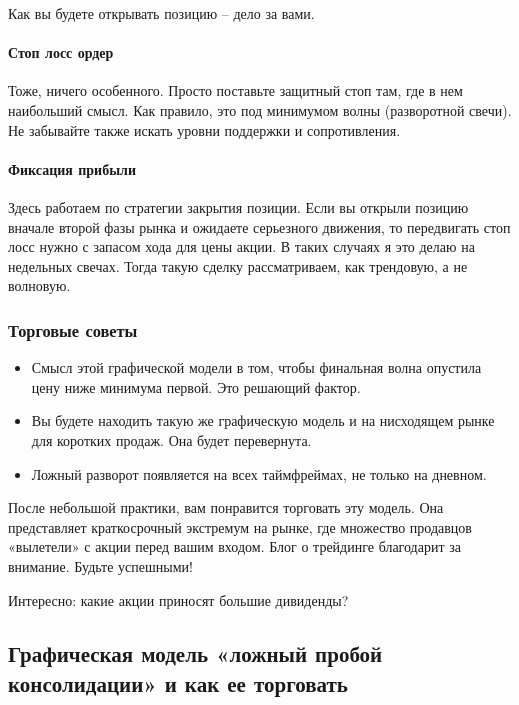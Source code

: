 \documentclass[a5paper]{article}
\begin{document}
Как вы будете открывать позицию – дело за вами.

\paragraph{Стоп лосс ордер}

Тоже, ничего особенного. Просто поставьте защитный стоп там, где в нем
наибольший смысл. Как правило, это под минимумом волны (разворотной
свечи). Не забывайте также искать уровни поддержки и сопротивления.

\paragraph{Фиксация прибыли}

Здесь работаем по стратегии закрытия позиции. Если вы открыли позицию
вначале второй фазы рынка и ожидаете серьезного движения, то
передвигать стоп лосс нужно с запасом хода для цены акции. В таких
случаях я это делаю на недельных свечах. Тогда такую сделку
рассматриваем, как трендовую, а не волновую.

\subsubsection{Торговые советы}

\begin{itemize}
\item     Смысл этой графической модели в том, чтобы финальная волна опустила цену ниже минимума первой. Это решающий фактор.
\item     Вы будете находить такую же графическую модель и на нисходящем рынке для коротких продаж. Она будет перевернута.
\item     Ложный разворот появляется на всех таймфреймах, не только на дневном.
\end{itemize}

После небольшой практики, вам понравится торговать эту модель. Она представляет краткосрочный экстремум на рынке, где множество продавцов «вылетели» с акции перед вашим входом. Блог о трейдинге благодарит за внимание. Будьте успешными!


Интересно: какие акции приносят большие дивиденды?

\subsection{Графическая модель «ложный пробой консолидации» и как ее
  торговать}
\end{document}
